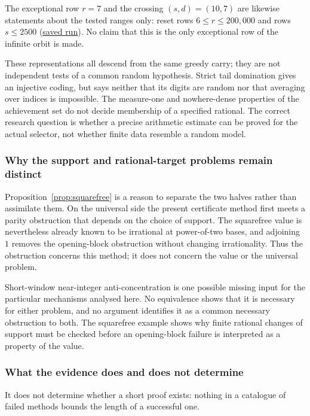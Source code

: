 The exceptional row $r=7$ and the crossing $(s,d)=(10,7)$ are likewise
statements about the tested ranges only: reset rows $6\le r\le200{,}000$
and rows $s\le2500$ (\href{https://github.com/wcook04/plectis-erdos/blob/f757115e03bebe5c04431a147da559015c680a37/research/experiments/erdos257/receipts/seam-reset-crossing-2500.json}{saved run}).  No claim that this is
the only exceptional row of the infinite orbit is made.

These representations all descend from the same greedy carry;
they are not independent tests of a common random hypothesis.  Strict
tail domination gives an injective coding, but says neither that its
digits are random nor that averaging over indices is impossible.  The
measure-one and nowhere-dense properties of the achievement set do not
decide membership of a specified rational.  The correct research question
is whether a precise arithmetic estimate can be proved for the actual
selector, not whether finite data resemble a random model.

\subsubsection*{Why the support and rational-target problems remain distinct}

Proposition~\ref{prop:squarefree} is a reason to separate the two halves
rather than assimilate them.  On the universal side the present
certificate method first meets a parity obstruction that depends on the choice of support.
The squarefree value is nevertheless already known to be irrational at
power-of-two bases, and adjoining $1$ removes the opening-block obstruction
without changing irrationality.  Thus the obstruction concerns this method; it
does not concern the value or the universal problem.

Short-window near-integer anti-concentration is one possible missing
input for the particular mechanisms analysed here.  No equivalence shows
that it is necessary for either problem, and no argument identifies it as
a common necessary obstruction to both.  The squarefree example shows why
finite rational changes of support must be checked before an opening-block
failure is interpreted as a property of the value.

\subsubsection*{What the evidence does and does not determine}

It does not determine whether a short proof exists: nothing in a catalogue of failed methods
bounds the length of a successful one.

